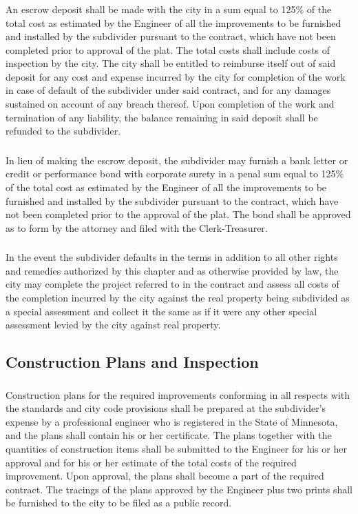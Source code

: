 \subsubsection{}
An escrow deposit shall be made with the city in a sum equal to 125\% of the total cost as estimated by the Engineer of all the improvements to be furnished and installed by the subdivider pursuant to the contract, which have not been completed prior to approval of the plat. The total costs shall include costs of inspection by the city. The city shall be entitled to reimburse itself out of said deposit for any cost and expense incurred by the city for completion of the work in case of default of the subdivider under said contract, and for any damages sustained on account of any breach thereof.  Upon completion of the work and termination of any liability, the balance remaining in said deposit shall be refunded to the subdivider.
\subsubsection{}
In lieu of making the escrow deposit, the subdivider may furnish a bank letter or credit or performance bond with corporate surety in a penal sum equal to 125\% of the total cost as estimated by the Engineer of all the improvements to be furnished and installed by the subdivider pursuant to the contract, which have not been completed prior to the approval of the plat. The bond shall be approved as to form by the attorney and filed with the Clerk-Treasurer.
\subsubsection{}
In the event the subdivider defaults in the terms in addition to all other rights and remedies authorized by this chapter and as otherwise provided by law, the city may complete the project referred to in the contract and assess all costs of the completion incurred by the city against the real property being subdivided as a special assessment and collect it the same as if it were any other special assessment levied by the city against real property.
\subsection{Construction Plans and Inspection}
\subsubsection{}
Construction plans for the required improvements conforming in all respects with the standards and city code provisions shall be prepared at the subdivider’s expense by a professional engineer who is registered in the State of Minnesota, and the plans shall contain his or her certificate. The plans together with the quantities of construction items shall be submitted to the Engineer for his or her approval and for his or her estimate of the total costs of the required improvement. Upon approval, the plans shall become a part of the required contract. The tracings of the plans approved by the Engineer plus two prints shall be furnished to the city to be filed as a public record.
